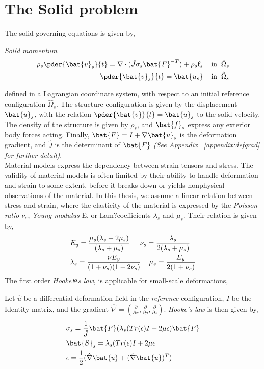 \section{The Solid problem}
\label{sec:solprob}
The solid governing equations is given by, 
\begin{equat}
\textit{Solid momentum}
\begin{align}
\rho_s \pder{\bat{v}_s}{t} = \nabla \cdot ( \hat{J} \sigma_s \bat{F}^{-T})  + \rho_s \mathbf{f}_s
\hspace{4mm} \text{in} \hspace{2mm} \hat{\Omega}_s \\
\pder{\bat{v}_s}{t} = \bat{u_s} \hspace{4mm} \text{in} \hspace{2mm}  \hat{\Omega}_s
\end{align}
\end{equat}
defined in a Lagrangian coordinate system, with respect to an initial reference configuration $\hat{\Omega}_s$. The structure configuration is given by the displacement $\bat{u}_s$, with the relation $\pder{\bat{v}}{t} = \bat{u}_s$ to the solid velocity. The density of the structure is given by $\rho_s$, and $\bat{f}_s$ express any exterior body forces acting. Finally, $\bat{F} = I + \nabla \bat{u}_s$ is the deformation gradient, and $\hat{J}$ is the determinant of $\bat{F}$ \textit{(See Appendix ~\ref{appendix:defgrad}  for further detail)}. \\
Material models express the dependency between strain tensors and stress. The validity of material models is often limited by their ability to handle deformation and strain to some extent, before it breaks down or yields nonphysical observations of the material. In this thesis, we assume a linear relation between stress and strain, where the elasticity of the material is expressed by the \textit{Poisson ratio} $\nu_s$, \textit{Young modulus} E, or Lam?coefficients  $\lambda_s$ and $\mu_s$. Their relation is given by,
\begin{align*}
&E_y = \frac{ \mu_s ( \lambda_s + 2 \mu_s) }{ ( \lambda_s + \mu_s ) } 
\hspace{5mm} \nu_s = \frac{\lambda_s}{2(\lambda_s + \mu_s)} \\
&\lambda_s = \frac{\nu E_y}{(1 + \nu_s)(1 - 2\nu_s)} \hspace{4mm} \mu_s = \frac{E_y}{2(1 + \nu_s)} 
\end{align*}
The first order \textit{Hookeﾴs law}, is applicable for small-scale deformations,
\begin{defn}
Let $\hat{u}$ be a differential deformation field in the \textit{reference} configuration, $I$ be the Identity matrix, and the gradient $\hat{\nabla} = (\frac{\partial}{\partial x}, \frac{\partial}{\partial y}, \frac{\partial}{\partial z}) $. \textit{Hooke's law} is then given by,
\begin{align*}
&\sigma_s = \frac{1}{\hat{J}} \bat{F}(\lambda_s(Tr(\epsilon) I + 2 \mu  \epsilon)\bat{F} \\
&\bat{S}_s = \lambda_s(Tr(\epsilon) I + 2 \mu \epsilon \\
&\epsilon = \frac{1}{2}(\hat{\nabla} \bat{u} + (\hat{\nabla} \bat{u})^T ) 
\end{align*} 
\end{defn}
